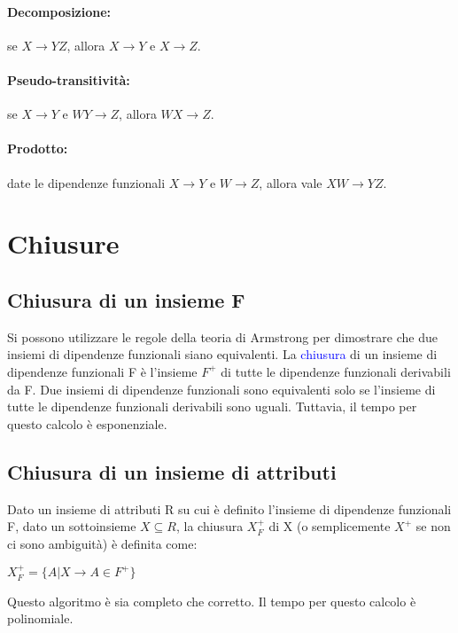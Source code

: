 \paragraph{Decomposizione:} se $X \rightarrow YZ$, allora $X \rightarrow Y$ e $X \rightarrow Z$.

\paragraph{Pseudo-transitività:} se $X \rightarrow Y$ e $WY \rightarrow Z$, allora $WX \rightarrow Z$.

\paragraph{Prodotto:} date le dipendenze funzionali $X \rightarrow Y$ e $W \rightarrow Z$, allora vale $XW \rightarrow YZ$.

\section{Chiusure}

\subsection{Chiusura di un insieme F}

Si possono utilizzare le regole della teoria di Armstrong per dimostrare che due insiemi di dipendenze funzionali siano equivalenti. La \textcolor{blue}{chiusura} di un insieme di dipendenze funzionali F è l’insieme $F^+$ di tutte le dipendenze funzionali derivabili da F. Due insiemi di dipendenze funzionali sono equivalenti solo se l'insieme di tutte le dipendenze funzionali derivabili sono uguali. Tuttavia, il tempo per questo calcolo è esponenziale.

\subsection{Chiusura di un insieme di attributi}

Dato un insieme di attributi R su cui è definito l’insieme di dipendenze funzionali F, dato un sottoinsieme $X \subseteq R$,
la chiusura $X_F^+$ di X (o semplicemente $X^+$ se non ci sono ambiguità) è definita come:
\begin{center}
$X_F^+ = \{A | X \rightarrow A \in F^+\}$
\end{center}

Questo algoritmo è sia completo che corretto. Il tempo per questo calcolo è polinomiale.

